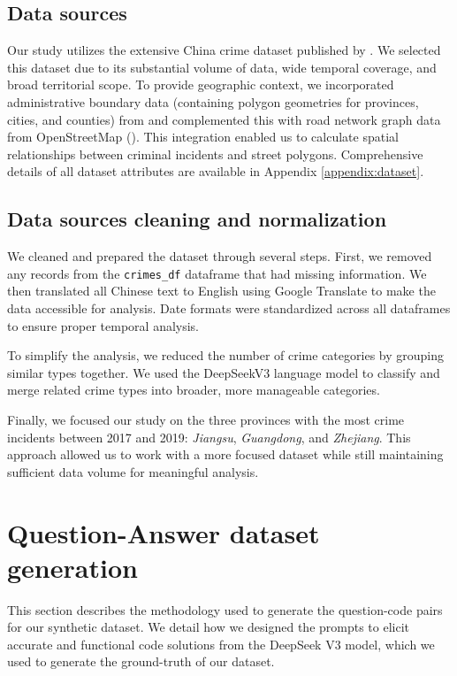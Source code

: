 \subsection{Data sources}

Our study utilizes the extensive China crime dataset published by \cite{Zhang2025CrimeDatasetChina}. We selected this dataset due to its substantial volume of data, wide temporal coverage, and broad territorial scope. To provide geographic context, we incorporated administrative boundary data (containing polygon geometries for provinces, cities, and counties) from \cite{GeoJSON2025China} and complemented this with road network graph data from OpenStreetMap (\cite{Vargas2021OSM}). This integration enabled us to calculate spatial relationships between criminal incidents and street polygons. Comprehensive details of all dataset attributes are available in Appendix \ref{appendix:dataset}.

\subsection{Data sources cleaning and normalization}
We cleaned and prepared the dataset through several steps. First, we removed any records from the \texttt{crimes\_df} dataframe that had missing information. We then translated all Chinese text to English using Google Translate to make the data accessible for analysis. Date formats were standardized across all dataframes to ensure proper temporal analysis.

To simplify the analysis, we reduced the number of crime categories by grouping similar types together. We used the DeepSeekV3 language model to classify and merge related crime types into broader, more manageable categories. 

Finally, we focused our study on the three provinces with the most crime incidents between 2017 and 2019: \textit{Jiangsu}, \textit{Guangdong}, and \textit{Zhejiang}. This approach allowed us to work with a more focused dataset while still maintaining sufficient data volume for meaningful analysis.

\section{Question-Answer dataset generation}

This section describes the methodology used to generate the question-code pairs for our synthetic dataset. We detail how we designed the prompts to elicit accurate and functional code solutions from the DeepSeek V3 model, which we used to generate the ground-truth of our dataset.

